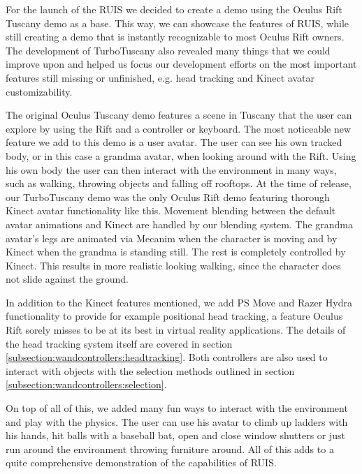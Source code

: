 \documentclass[12pt,a4paper,oneside,pdftex]{report}
\begin{document}
For the launch of the RUIS we decided to create a demo using the Oculus Rift Tuscany demo as a base. This way, we can showcase the features of RUIS, while still creating a demo that is instantly recognizable to most Oculus Rift owners. The development of TurboTuscany also revealed many things that we could improve upon and helped us focus our development efforts on the most important features still missing or unfinished, e.g. head tracking and Kinect avatar customizability.

The original Oculus Tuscany demo features a scene in Tuscany that the user can explore by using the Rift and a controller or keyboard. The most noticeable new feature we add to this demo is a user avatar. The user can see his own tracked body, or in this case a grandma avatar, when looking around with the Rift. Using his own body the user can then interact with the environment in many ways, such as walking, throwing objects and falling off rooftops. At the time of release, our TurboTuscany demo was the only Oculus Rift demo featuring thorough Kinect avatar functionality like this. Movement blending between the default avatar animations and Kinect are handled by our blending system. The grandma avatar's legs are animated via Mecanim when the character is moving and by Kinect when the grandma is standing still. The rest is completely controlled by Kinect. This results in more realistic looking walking, since the character does not slide against the ground.

In addition to the Kinect features mentioned, we add PS Move and Razer Hydra functionality to provide for example positional head tracking, a feature Oculus Rift sorely misses to be at its best in virtual reality applications. The details of the head tracking system itself are covered in section \ref{subsection:wandcontrollers:headtracking}. Both controllers are also used to interact with objects with the selection methods outlined in section \ref{subsection:wandcontrollers:selection}.

On top of all of this, we added many fun ways to interact with the environment and play with the physics. The user can use his avatar to climb up ladders with his hands, hit balls with a baseball bat, open and close window shutters or just run around the environment throwing furniture around. All of this adds to a quite comprehensive demonstration of the capabilities of RUIS.


\end{document}
